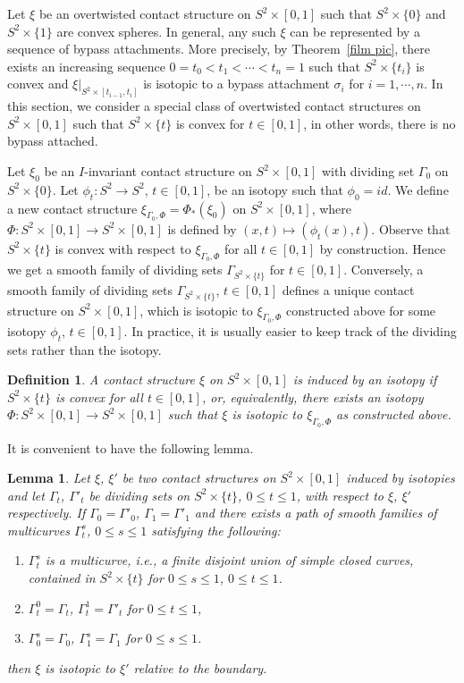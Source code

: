 \documentclass[12pt]{amsart}
\newtheorem{defn}[thm]{Definition}
\newtheorem{lemma}[thm]{Lemma}
\theoremstyle{remark}
\newcommand{\be}{\begin{enumerate}}
\newcommand{\ee}{\end{enumerate}}
\begin{document}
Let $\xi$ be an overtwisted contact structure on $S^2\times[0,1]$ such that $S^2\times\{0\}$ and $S^2\times\{1\}$ are convex spheres. In general, any such $\xi$ can be represented by a sequence of bypass attachments. More precisely, by Theorem~\ref{film pic}, there exists an increasing sequence $0=t_0<t_1< \cdots <t_n=1$ such that $S^2\times\{t_i\}$ is convex and $\xi|_{S^2\times[t_{i-1},t_i]}$ is isotopic to a bypass attachment $\sigma_i$ for $i=1,\cdots,n$. In this section, we consider a special class of overtwisted contact structures on $S^2\times[0,1]$ such that $S^2\times\{t\}$ is convex for $t\in[0,1]$, in other words, there is no bypass attached.

Let $\xi_0$ be an $I$-invariant contact structure on $S^2\times[0,1]$ with dividing set $\Gamma_0$ on $S^2\times\{0\}$. Let $\phi_t:S^2 \to S^2$, $t\in[0,1]$, be an isotopy such that $\phi_0=id$. We define a new contact structure $\xi_{\Gamma_0,\Phi}=\Phi_*(\xi_0)$ on $S^2\times[0,1]$, where $\Phi:S^2\times[0,1] \to S^2\times[0,1]$ is defined by $(x,t)\mapsto(\phi_t(x),t)$. Observe that $S^2\times\{t\}$ is convex with respect to $\xi_{\Gamma_0,\Phi}$ for all $t\in[0,1]$ by construction. Hence we get a smooth family of dividing sets $\Gamma_{S^2\times\{t\}}$ for $t\in[0,1]$. Conversely, a smooth family of dividing sets $\Gamma_{S^2\times\{t\}}$, $t\in[0,1]$ defines a unique contact structure on $S^2\times[0,1]$, which is isotopic to $\xi_{\Gamma_0,\Phi}$ constructed above for some isotopy $\phi_t$, $t\in[0,1]$. In practice, it is usually easier to keep track of the dividing sets rather than the isotopy.

\begin{defn}
A contact structure $\xi$ on $S^2\times[0,1]$ is {\em induced by an isotopy} if $S^2\times\{t\}$ is convex for all $t\in[0,1]$, or, equivalently, there exists an isotopy $\Phi:S^2\times[0,1] \to S^2\times[0,1]$ such that $\xi$ is isotopic to $\xi_{\Gamma_0,\Phi}$ as constructed above.
\end{defn}

It is convenient to have the following lemma.

\begin{lemma} \label{rounding}
Let $\xi$, $\xi'$ be two contact structures on $S^2\times[0,1]$ induced by isotopies and let $\Gamma_t$, $\Gamma'_t$ be dividing sets on $S^2\times\{t\}$, $0\leq t\leq1$, with respect to $\xi$, $\xi'$ respectively. If $\Gamma_0=\Gamma'_0$, $\Gamma_1=\Gamma'_1$ and there exists a path of smooth families of multicurves $\Gamma^s_t$, $0\leq s\leq 1$ satisfying the following:
\be
    \item{$\Gamma^s_t$ is a multicurve, i.e., a finite disjoint union of simple closed curves, contained in $S^2\times\{t\}$ for $0\leq s\leq1$, $0\leq t\leq1$.}
    \item{$\Gamma^0_t=\Gamma_t$, $\Gamma^1_t=\Gamma'_t$ for $0\leq t\leq1$,}
    \item{$\Gamma^s_0=\Gamma_0$, $\Gamma^s_1=\Gamma_1$ for $0\leq s\leq1$.}
\ee
then $\xi$ is isotopic to $\xi'$ relative to the boundary.
\end{lemma}
\end{document}
